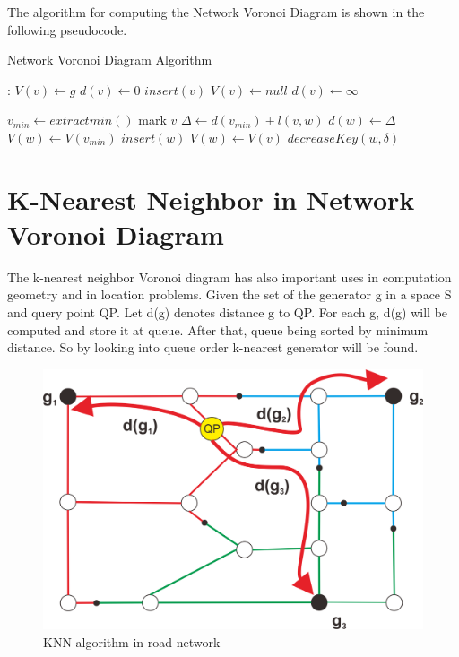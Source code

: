 The algorithm for computing the Network Voronoi Diagram is shown in the following pseudocode.

\begin{algorithm}
\caption{Network Voronoi Diagram Algorithm}
\begin{algorithmic}[1]
:
		\State $V(v)\gets g$
		\State $d(v)\gets 0$
		\State $insert(v)$
	\Else
		\State $V(v)\gets null$
		\State $d(v)\gets \infty$
	\EndIf
\EndFor

	\State $v_{min}\gets extractmin()$
	\State mark  $v$
		\State $\Delta\gets d(v_{min}) + l(v, w)$
			\State $d(w)\gets \Delta$
			\State $V(w)\gets V(v_{min})$
			\State $insert(w)$
		\Else
			\State $V(w)\gets V(v)$
			\State $decreaseKey(w, \delta)$
		\EndIf
	\EndFor
\EndWhile
\EndProcedure
\end{algorithmic}
\end{algorithm}

\pagebreak
\section{K-Nearest Neighbor in Network Voronoi Diagram} 

The k-nearest neighbor Voronoi diagram has also important uses in computation geometry and in location problems. Given the set of the generator g in a space S and query point QP. Let d(g) denotes distance g to QP. For each g, d(g) will be computed and store it at queue. After that, queue being sorted by minimum distance. So by looking into queue order k-nearest generator will be found.
\begin{figure}[H]
    \centering
    \includegraphics[scale=0.8]{knn_basic.png}
    \caption{KNN algorithm in road network}
    \label{fig:my_label}
\end{figure} 

